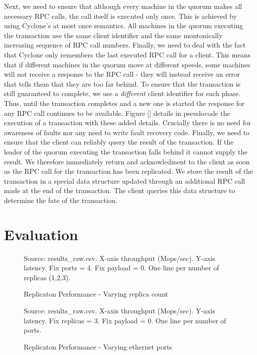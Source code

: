 \documentclass[twocolumn]{article}
\begin{document}
Next, we need to ensure that although every machine in the quorum makes all
necessary RPC calls, the call itself is executed only once. This is achieved by
using Cyclone's at most once semantics. All machines in the quorum executing the
transaction use the same client identifier and the same montonically increasing
sequence of RPC call numbers. Finally, we need to deal with the fact that
Cyclone only remembers the last executed RPC call for a client. This means that
if different machines in the quorum move at different speeds, some machines will
not receive a response to the RPC call - they will instead receive an error that
tells them that they are too far behind. To ensure that the transaction is still
guaranteed to complete, we use a \emph{different} client identifier for each
phase. Thus, until the transaction completes and a new one is started the
response for any RPC call continues to be available. Figure [] details in
pseudocode the execution of a transaction with these added details. Crucially
there is no need for awareness of faults nor any need to write fault recovery
code. Finally, we need to ensure that the client can reliably query the result
of the transaction. If the leader of the quorum executing the transaction falls
behind it cannot supply the result. We therefore immediately return and
acknowledment to the client as soon as the RPC call for the transaction has been
replicated. We store the result of the transaction in a special data structure
updated through an additional RPC call made at the end of the transaction. The
client queries this data structure to determine the fate of the transaction.

\section{Evaluation}
\begin{figure}
  Source: results_raw.csv. X-axis throughput (Mops/sec). Y-axis latency. Fix
  ports = 4. Fix payload = 0. One line per number of replicas (1,2,3).
  \caption{Replicaton Performance - Varying replica count}
  \label{fig:perf_rep}
\end{figure}

\begin{figure}
  Source: results_raw.csv. X-axis throughput (Mops/sec). Y-axis latency. Fix
  replicas = 3. Fix payload = 0. One line per number of ports.
  \caption{Replicaton Performance - Varying ethernet ports}
  \label{fig:perf_ports}
\end{figure}
\end{document}
